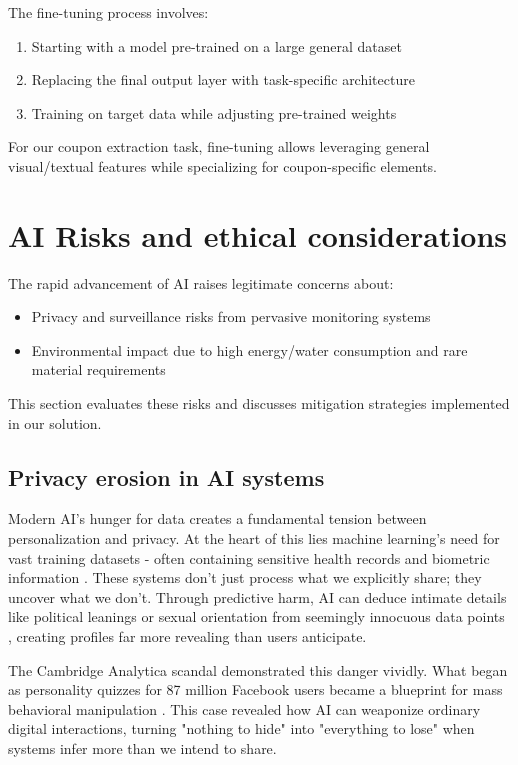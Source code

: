 \documentclass[licencjacka,en]{pracamgr}
\begin{document}
The fine-tuning process involves:
\begin{enumerate}
    \item Starting with a model pre-trained on a large general dataset
    \item Replacing the final output layer with task-specific architecture
    \item Training on target data while adjusting pre-trained weights \cite{finetune_cool_image}
\end{enumerate}

For our coupon extraction task, fine-tuning allows leveraging general visual/textual features while specializing for coupon-specific elements.

\section{AI Risks and ethical considerations}

The rapid advancement of AI raises legitimate concerns about:
\begin{itemize}
    \item Privacy and surveillance risks from pervasive monitoring systems \cite{not_sroka_vid, ai_scare2, ai_scare3}
    \item Environmental impact due to high energy/water consumption and rare material requirements \cite{ai_env_concerns}
\end{itemize}

This section evaluates these risks and discusses mitigation strategies implemented in our solution.

\subsection{Privacy erosion in AI systems}
Modern AI's hunger for data creates a fundamental tension between personalization and privacy. At the heart of this lies machine learning's need for vast training datasets - often containing sensitive health records and biometric information \cite{ibm_vast_data, data_guard}. These systems don't just process what we explicitly share; they uncover what we don't. Through predictive harm, AI can deduce intimate details like political leanings or sexual orientation from seemingly innocuous data points \cite{transcend}, creating profiles far more revealing than users anticipate.

The Cambridge Analytica scandal demonstrated this danger vividly. What began as personality quizzes for 87 million Facebook users became a blueprint for mass behavioral manipulation \cite{transcend}. This case revealed how AI can weaponize ordinary digital interactions, turning "nothing to hide" into "everything to lose" when systems infer more than we intend to share.
\end{document}
